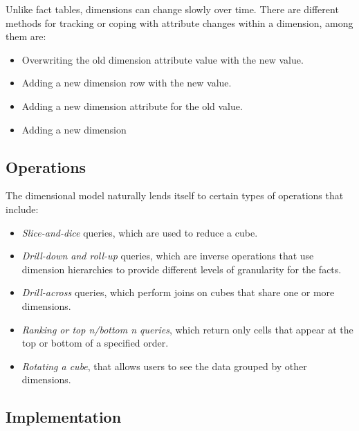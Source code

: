 \documentclass[]{article}
\begin{document}
Unlike fact tables, dimensions can change slowly over time. There are different methods for tracking or coping with attribute changes within a dimension, among them are:
\begin{itemize}
	\item Overwriting the old dimension attribute value with the new value.
	\item Adding a new dimension row with the new value.
	\item Adding a new dimension attribute for the old value.
	\item Adding a new dimension
\end{itemize}


\subsection{Operations} %
\label{sub:operations}

The dimensional model naturally lends itself to certain types of operations that include:

\begin{itemize}
	\item \emph{Slice-and-dice} queries, which are used to reduce a cube. 
	\item \emph{Drill-down and roll-up} queries, which are inverse operations that use dimension hierarchies to provide different levels of granularity for the facts.
	\item \emph{Drill-across} queries, which perform joins on cubes that share one or more dimensions. 
	\item \emph{Ranking or top n/bottom n queries}, which return only cells that appear at the top or bottom of a specified order.
	\item \emph{Rotating a cube}, that allows users to see the data grouped by other dimensions.
\end{itemize}


\subsection{Implementation} %
\label{sub:implementation}
\end{document}
